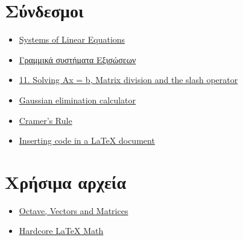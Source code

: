 \documentclass[12pt]{extreport}
\begin{document}
\section{Σύνδεσμοι}
\begin{itemize}
    \item \href{http://sites.science.oregonstate.edu/math/home/programs/undergrad/CalculusQuestStudyGuides/vcalc/system/system.html}{Systems of Linear Equations}
    \item \href{http://esperia.iesl.forth.gr/~kafesaki/Applied-Mathematics/linear-algebra/linear-systems.pdf}{Γραμμικά συστήματα Εξισώσεων}
    \item \href{http://www-h.eng.cam.ac.uk/help/programs/octave/tutorial/}{11. Solving Ax = b, Matrix division and the slash operator}
    \item \href{https://onlinemschool.com/math/assistance/equation/gaus/}{Gaussian elimination calculator}
    \item \href{http://www.matrixlab-examples.com/cramers-rule.html}{Cramer's Rule}
    \item \href{https://pt.overleaf.com/learn/latex/Code_listing}{Inserting code in a LaTeX document}
\end{itemize}
\section{Χρήσιμα αρχεία}
\begin{itemize}
    \item \href{http://www.yanivplan.com/files/tutorial2vectors.pdf}{Octave, Vectors and Matrices}
    \item \href{http://web.mit.edu/rsi/www/pdfs/advmath.pdf}{Hardcore LaTeX Math}
\end{itemize}
\end{document}
